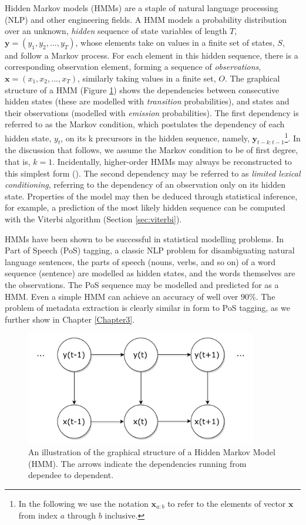 Hidden Markov models (HMMs) are a staple of natural language processing (NLP) and other engineering fields. A HMM models a probability distribution over an unknown, \emph{hidden} sequence of state variables of length $T$, $\mathbf{y} = (y_1, y_2, ..., y_T)$, whose elements take on values in a finite set of states, $S$, and follow a Markov process. For each element in this hidden sequence, there is a corresponding observation element, forming a sequence of \emph{observations}, $\mathbf{x} = (x_1, x_2, ..., x_T)$, similarly taking values in a finite set, $O$. The graphical structure of a HMM (Figure \ref{fig:HMM}) shows the dependencies between consecutive hidden states (these are modelled with \emph{transition} probabilities), and states and their observations (modelled with \emph{emission} probabilities). The first dependency is referred to as the Markov condition, which postulates the dependency of each hidden state, $y_t$, on its k precursors in the hidden sequence, namely, $\mathbf{y}_{t-k:t-1}$\footnote{In the following we use the notation $\mathbf{x}_{a:b}$ to refer to the elements of vector $\mathbf{x}$ from index $a$ through $b$ inclusive.}. In the discussion that follows, we assume the Markov condition to be of first degree, that is, $k =1$. Incidentally, higher-order HMMs may always be reconstructed to this simplest form (\cite{reference}). The second dependency may be referred to as \emph{limited lexical conditioning}, referring to the dependency of an observation only on its hidden state. Properties of the model may then be deduced through statistical inference, for example, a prediction of the most likely hidden sequence can be computed with the Viterbi algorithm (Section \ref{sec:viterbi}).

HMMs have been shown to be successful in statistical modelling problems. In Part of Speech (PoS) tagging, a classic NLP problem for disambiguating natural language sentences, the parts of speech (nouns, verbs, and so on) of a word sequence (sentence) are modelled as hidden states, and the words themselves are the observations. The PoS sequence may be modelled and predicted for as a HMM. Even a simple HMM can achieve an accuracy of well over $90\%$. The problem of metadata extraction is clearly similar in form to PoS tagging, as we further show in Chapter \ref{Chapter3}.

\begin{figure}[!ht]
\center
\includegraphics[width=4in]{Figures/HMM.pdf}
\caption{An illustration of the graphical structure of a Hidden Markov Model (HMM). The arrows indicate the dependencies running from dependee to dependent.}
\label{fig:HMM}
\end{figure}

